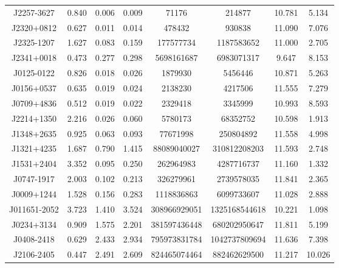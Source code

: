 \begin{xltabular}{\textwidth}{cccccccc}
     J2257-3627 & 0.840 & 0.006 & 0.009  & 71176 & 214877  & 10.781 & 5.134  \\*
     J2320+0812 & 0.627 & 0.011 & 0.014  & 478432 & 930838  & 11.090 & 7.076  \\ \addlinespace
     J2325-1207 & 1.627 & 0.083 & 0.159  & 177577734 & 1187583652  & 11.000 & 2.705  \\*
     J2341+0018 & 0.473 & 0.277 & 0.298  & 5698161687 & 6983071317  & 9.647 & 8.153  \\*
      J0125-0122 & 0.826 & 0.018 & 0.026  & 1879930 & 5456446  & 10.871 & 5.263 \\*
    J0156+0537 & 0.635 & 0.019 & 0.024  & 2138230 & 4217506  & 11.555 & 7.279   \\*
    J0709+4836 & 0.512 & 0.019 & 0.022  & 2329418 & 3345999  & 10.993 & 8.593\\*
    J2214+1350 & 2.216 & 0.026 & 0.060  & 5780173 & 68352752  & 10.598 & 1.913  \\*
    J1348+2635 & 0.925 & 0.063 & 0.093  & 77671998 & 250804892  & 11.558 & 4.998 \\*
     J1321+4235 & 1.687 & 0.790 & 1.415  & 88089040027 & 310812208203  & 11.593 & 2.748 \\*
    J1531+2404 & 3.352 & 0.095 & 0.250  & 262964983 & 4287716737  & 11.160 & 1.332  \\*
    J0747-1917 & 2.003 & 0.102 & 0.213  & 326279961 & 2739578035  & 11.841 & 2.365 \\*
    J0009+1244 & 1.528 & 0.156 & 0.283  & 1118836863 & 6099733607  & 11.028 & 2.888  \\*
    J011651-2052 & 3.723 & 1.410 & 3.524  & 308966929051 & 1325168544618  & 10.221 & 1.098  \\*
    J0234+3134 & 0.909 & 1.575 & 2.201  & 381597436448 & 680202950647  & 11.811 & 5.199  \\*
    J0408-2418 & 0.629 & 2.433 & 2.934  & 795973831784 & 1042737809694  & 11.636 & 7.398  \\*
    J2106-2405 & 0.447 & 2.491 & 2.609  & 824465074464 & 882462629500  & 11.217 & 10.026 \\*

\end{xltabular}
